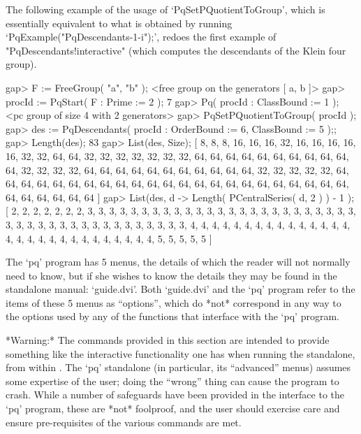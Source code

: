 The following example of the usage of `PqSetPQuotientToGroup',  which  is
essentially   equivalent    to    what    is    obtained    by    running
`PqExample("PqDescendants-1-i");',   redoes   the   first   example    of
"PqDescendants!interactive" (which computes the descendants of the  Klein
four group).

\beginexample
gap> F := FreeGroup( "a", "b" );
<free group on the generators [ a, b ]>
gap> procId := PqStart( F : Prime := 2 );
7
gap> Pq( procId : ClassBound := 1 );
<pc group of size 4 with 2 generators>
gap> PqSetPQuotientToGroup( procId );
gap> des := PqDescendants( procId : OrderBound := 6, ClassBound := 5 );;
gap> Length(des);
83
gap> List(des, Size);
[ 8, 8, 8, 16, 16, 16, 32, 16, 16, 16, 16, 16, 32, 32, 64, 64, 32, 32, 32, 
  32, 32, 32, 32, 64, 64, 64, 64, 64, 64, 64, 64, 64, 64, 64, 32, 32, 32, 32, 
  64, 64, 64, 64, 64, 64, 64, 64, 64, 64, 64, 32, 32, 32, 32, 32, 64, 64, 64, 
  64, 64, 64, 64, 64, 64, 64, 64, 64, 64, 64, 64, 64, 64, 64, 64, 64, 64, 64, 
  64, 64, 64, 64, 64, 64, 64 ]
gap> List(des, d -> Length( PCentralSeries( d, 2 ) ) - 1 );
[ 2, 2, 2, 2, 2, 2, 2, 3, 3, 3, 3, 3, 3, 3, 3, 3, 3, 3, 3, 3, 3, 3, 3, 3, 3, 
  3, 3, 3, 3, 3, 3, 3, 3, 3, 3, 3, 3, 3, 3, 3, 3, 3, 3, 3, 3, 3, 3, 3, 3, 4, 
  4, 4, 4, 4, 4, 4, 4, 4, 4, 4, 4, 4, 4, 4, 4, 4, 4, 4, 4, 4, 4, 4, 4, 4, 4, 
  4, 4, 4, 5, 5, 5, 5, 5 ]
\endexample


The `pq' program has 5 menus, the details of which  the  reader  will  not
normally need to know, but if she wishes to know the details they may  be
found in the standalone manual: `guide.dvi'.  Both  `guide.dvi'  and  the
`pq' program refer to the items of these 5 menus as ``options'', which  do
*not* correspond in any way to the options used  by  any  of  the  {\GAP}
functions that interface with the `pq' program.

*Warning:*
The commands provided in this section are intended to  provide  something
like the interactive functionality one has when running  the  standalone,
from within {\GAP}. The `pq' standalone (in particular, its  ``advanced''
menus) assumes some expertise of the user; doing the ``wrong'' thing  can
cause the program to crash.  While  a  number  of  safeguards  have  been
provided in the {\GAP} interface to the `pq'  program,  these  are  *not*
foolproof, and the user should exercise care and ensure pre-requisites of
the various commands are met.

